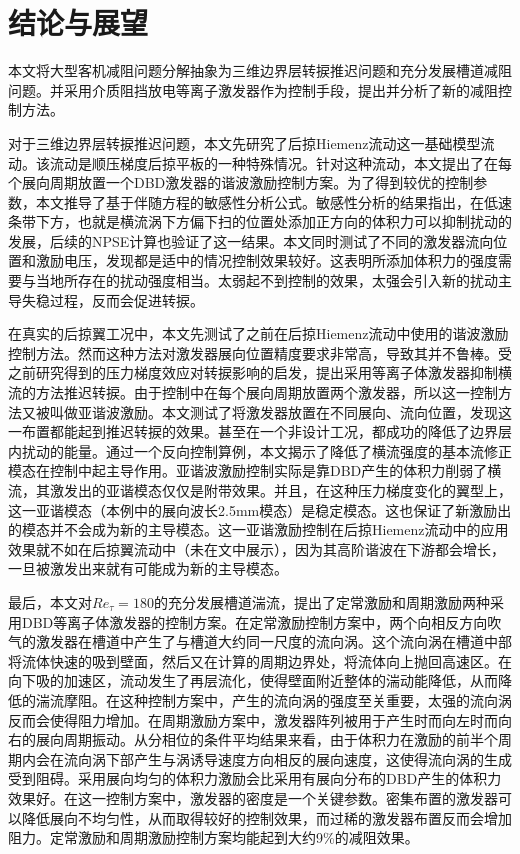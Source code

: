 \chapter{结论与展望}
本文将大型客机减阻问题分解抽象为三维边界层转捩推迟问题和充分发展槽道减阻问题。并采用介质阻挡放电等离子激发器作为控制手段，提出并分析了新的减阻控制方法。

对于三维边界层转捩推迟问题，本文先研究了后掠Hiemenz流动这一基础模型流动。该流动是顺压梯度后掠平板的一种特殊情况。针对这种流动，本文提出了在每个展向周期放置一个DBD激发器的谐波激励控制方案。为了得到较优的控制参数，本文推导了基于伴随方程的敏感性分析公式。敏感性分析的结果指出，在低速条带下方，也就是横流涡下方偏下扫的位置处添加正方向的体积力可以抑制扰动的发展，后续的NPSE计算也验证了这一结果。本文同时测试了不同的激发器流向位置和激励电压，发现都是适中的情况控制效果较好。这表明所添加体积力的强度需要与当地所存在的扰动强度相当。太弱起不到控制的效果，太强会引入新的扰动主导失稳过程，反而会促进转捩。

在真实的后掠翼工况中，本文先测试了之前在后掠Hiemenz流动中使用的谐波激励控制方法。然而这种方法对激发器展向位置精度要求非常高，导致其并不鲁棒。受之前研究得到的压力梯度效应对转捩影响的启发，提出采用等离子体激发器抑制横流的方法推迟转捩。由于控制中在每个展向周期放置两个激发器，所以这一控制方法又被叫做亚谐波激励。本文测试了将激发器放置在不同展向、流向位置，发现这一布置都能起到推迟转捩的效果。甚至在一个非设计工况，都成功的降低了边界层内扰动的能量。通过一个反向控制算例，本文揭示了降低了横流强度的基本流修正模态在控制中起主导作用。亚谐波激励控制实际是靠DBD产生的体积力削弱了横流，其激发出的亚谐模态仅仅是附带效果。并且，在这种压力梯度变化的翼型上，这一亚谐模态（本例中的展向波长2.5mm模态）是稳定模态。这也保证了新激励出的模态并不会成为新的主导模态。这一亚谐激励控制在后掠Hiemenz流动中的应用效果就不如在后掠翼流动中（未在文中展示），因为其高阶谐波在下游都会增长，一旦被激发出来就有可能成为新的主导模态。

最后，本文对$Re_\tau=180$的充分发展槽道湍流，提出了定常激励和周期激励两种采用DBD等离子体激发器的控制方案。在定常激励控制方案中，两个向相反方向吹气的激发器在槽道中产生了与槽道大约同一尺度的流向涡。这个流向涡在槽道中部将流体快速的吸到壁面，然后又在计算的周期边界处，将流体向上抛回高速区。在向下吸的加速区，流动发生了再层流化，使得壁面附近整体的湍动能降低，从而降低的湍流摩阻。在这种控制方案中，产生的流向涡的强度至关重要，太强的流向涡反而会使得阻力增加。在周期激励方案中，激发器阵列被用于产生时而向左时而向右的展向周期振动。从分相位的条件平均结果来看，由于体积力在激励的前半个周期内会在流向涡下部产生与涡诱导速度方向相反的展向速度，这使得流向涡的生成受到阻碍。采用展向均匀的体积力激励会比采用有展向分布的DBD产生的体积力效果好。在这一控制方案中，激发器的密度是一个关键参数。密集布置的激发器可以降低展向不均匀性，从而取得较好的控制效果，而过稀的激发器布置反而会增加阻力。定常激励和周期激励控制方案均能起到大约9\%的减阻效果。

